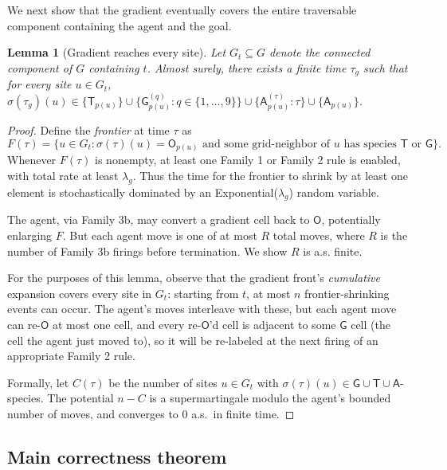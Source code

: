 \documentclass[11pt]{article}
\theoremstyle{plain}
\newtheorem{lemma}[theorem]{Lemma}
\theoremstyle{definition}
\theoremstyle{remark}
\begin{document}
We next show that the gradient eventually covers the entire traversable component containing the agent and the goal.

\begin{lemma}[Gradient reaches every site]
\label{lem:gradient-covers}
Let $G_t \subseteq G$ denote the connected component of $G$ containing $t$. Almost surely, there exists a finite time $\tau_g$ such that for every site $u \in G_t$, $\sigma(\tau_g)(u) \in \{\mathsf{T}_{p(u)}\} \cup \{\mathsf{G}^{(q)}_{p(u)} : q \in \{1, \ldots, 9\}\} \cup \{\mathsf{A}^{(\tau)}_{p(u)} : \tau\} \cup \{\mathsf{A}_{p(u)}\}$.
\end{lemma}

\begin{proof}
Define the \emph{frontier} at time $\tau$ as
\[
F(\tau) = \{u \in G_t : \sigma(\tau)(u) = \mathsf{O}_{p(u)} \text{ and some grid-neighbor of } u \text{ has species } \mathsf{T} \text{ or } \mathsf{G}\}.
\]
Whenever $F(\tau)$ is nonempty, at least one Family 1 or Family 2 rule is enabled, with total rate at least $\lambda_g$. Thus the time for the frontier to shrink by at least one element is stochastically dominated by an Exponential($\lambda_g$) random variable.

The agent, via Family 3b, may convert a gradient cell back to $\mathsf{O}$, potentially enlarging $F$. But each agent move is one of at most $R$ total moves, where $R$ is the number of Family 3b firings before termination. We show $R$ is a.s. finite.

For the purposes of this lemma, observe that the gradient front's \emph{cumulative} expansion covers every site in $G_t$: starting from $t$, at most $n$ frontier-shrinking events can occur. The agent's moves interleave with these, but each agent move can re-$\mathsf{O}$ at most one cell, and every re-$\mathsf{O}$'d cell is adjacent to some $\mathsf{G}$ cell (the cell the agent just moved to), so it will be re-labeled at the next firing of an appropriate Family 2 rule.

Formally, let $C(\tau)$ be the number of sites $u \in G_t$ with $\sigma(\tau)(u) \in \mathsf{G} \cup \mathsf{T} \cup \mathsf{A}$-species. The potential $n - C$ is a supermartingale modulo the agent's bounded number of moves, and converges to $0$ a.s.\ in finite time.
\end{proof}

\subsection{Main correctness theorem}
\end{document}

